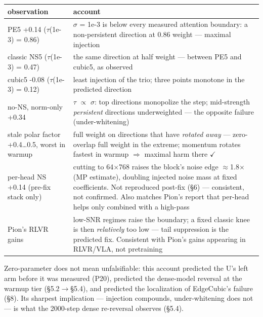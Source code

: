 \documentclass[
]{article}
\newcounter{none} %
\begin{document}
{\def\LTcaptype{none} %
\begin{longtable}[]{@{}
  >{\raggedright\arraybackslash}p{}
  >{\raggedright\arraybackslash}p{}@{}}
\toprule\noalign{}
\begin{minipage}[b]{\linewidth}\raggedright
observation
\end{minipage} & \begin{minipage}[b]{\linewidth}\raggedright
account
\end{minipage} \\
\midrule\noalign{}
\endhead
\bottomrule\noalign{}
\endlastfoot
PE5 +0.14 (\(\tau\)(1e-3) = 0.86) & \(\sigma\) = 1e-3 is below every
measured attention boundary: a non-persistent direction at 0.86 weight
--- maximal injection \\
classic NS5 (\(\tau\)(1e-3) = 0.47) & the same direction at half weight
--- between PE5 and cubic5, as observed \\
cubic5 -0.08 (\(\tau\)(1e-3) = 0.12) & least injection of the trio;
three points monotone in the predicted direction \\
no-NS, norm-only +0.34 & \(\tau\) \(\propto\) \(\sigma\): top directions
monopolize the step; mid-strength \emph{persistent} directions
underweighted --- the opposite failure (under-whitening) \\
stale polar factor +0.4\ldots0.5, worst in warmup & full weight on
directions that have \emph{rotated away} --- zero-overlap full weight in
the extreme; momentum rotates fastest in warmup \(\Rightarrow\) maximal
harm there \(\checkmark\) \\
per-head NS +0.14 (pre-fix stack only) & cutting to 64\(\times\){}768
raises the block's noise edge \(\approx\){}1.8\(\times\) (MP
estimate), doubling injected noise mass at fixed coefficients. Not
reproduced post-fix (§6) --- consistent, not confirmed. Also matches
Pion's report that per-head helps only combined with a high-pass \\
Pion's RLVR gains & low-SNR regimes raise the boundary; a fixed classic
knee is then \emph{relatively} too low --- tail suppression is the
predicted fix. Consistent with Pion's gains appearing in RLVR/VLA, not
pretraining \\
\end{longtable}
}

Zero-parameter does not mean unfalsifiable: this account predicted the
U's left arm before it was measured (P20), predicted the dense-model
reversal at the warmup tier (§5.2\(\to\)§5.4), and predicted the
localization of EdgeCubic's failure (§8). Its sharpest implication ---
injection compounds, under-whitening does not --- is what the 2000-step
dense re-reversal observes (§5.4).
\end{document}
